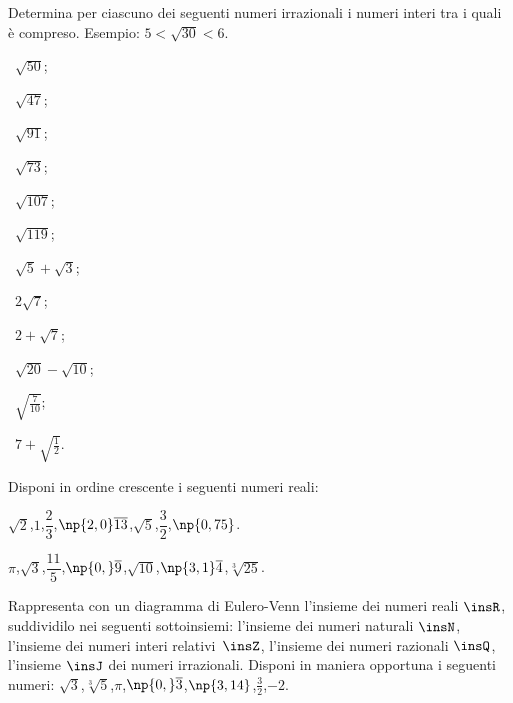 \begin{esercizio}
\label{ese:1.4}
Determina per ciascuno dei seguenti numeri irrazionali i numeri interi tra i quali è compreso. Esempio: $5<\sqrt{30}<6$.
\begin{multicols}{3}
\begin{enumeratea}
 \item~$\sqrt{50}$;
 \item~$\sqrt{47}$;
 \item~$\sqrt{91}$;
 \item~$\sqrt{73}$;
 \item~$\sqrt{107}$;
 \item~$\sqrt{119}$;
 \item~$\sqrt{5}+\sqrt{3}$;
 \item~$2\sqrt{7}$;
 \item~$2+\sqrt{7}$;
 \item~$\sqrt{20}-\sqrt{10}$;
 \item~$\sqrt{\frac{7}{10}}$;
 \item~$7+\sqrt{\frac{1}{2}}$.
\end{enumeratea}
\end{multicols}
\end{esercizio}

\begin{esercizio}
\label{ese:1.5}
 Disponi in ordine crescente i seguenti numeri reali:
 \begin{enumeratea}
 \item $\sqrt{2}$,\quad $1$,\quad $\dfrac{2}{3}$,\quad $\np{2,0}\overline{13}$,\quad $\sqrt{5}$,\quad $\dfrac{3}{2}$,\quad $\np{0,75}$.
 \item $\pi$,\quad $\sqrt{3}$,\quad $\dfrac{11}{5}$,\quad $\np{0,}\overline{9}$,\quad $\sqrt{10}$,\quad $\np{3,1}\overline{4}$,\quad $\sqrt[3]{25}$.
 \end{enumeratea}
\end{esercizio}

\begin{esercizio}
\label{ese:1.6}
 Rappresenta con un diagramma di Eulero-Venn l'insieme dei numeri reali $\insR$, suddividilo nei seguenti sottoinsiemi: l'insieme dei numeri naturali $\insN$, l'insieme dei numeri interi relativi~$\insZ$, l'insieme dei numeri razionali $\insQ$, l'insieme $\insJ$ dei numeri irrazionali. Disponi in maniera opportuna i seguenti numeri: $\sqrt{3}$,\quad $\sqrt[3]{5}$,\quad$\pi$,\quad $\np{0,}\overline{3}$,\quad $\np{3,14}$,\quad $\frac{3}{2}$,\quad$-2$.
\end{esercizio}

